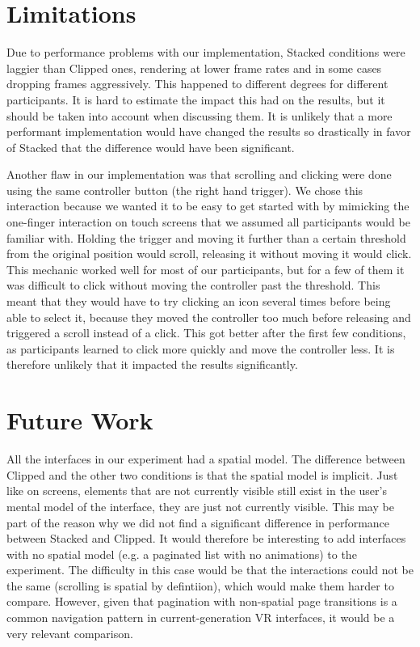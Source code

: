 \documentclass[nobib]{tufte-book} %
\begin{document}
\section{Limitations}
Due to performance problems with our implementation, Stacked conditions were laggier than Clipped ones, rendering at lower frame rates and in some cases dropping frames aggressively. This happened to different degrees for different participants. It is hard to estimate the impact this had on the results, but it should be taken into account when discussing them. It is unlikely that a more performant implementation would have changed the results so drastically in favor of Stacked that the difference would have been significant.

Another flaw in our implementation was that scrolling and clicking were done using the same controller button (the right hand trigger). We chose this interaction because we wanted it to be easy to get started with by mimicking the one-finger interaction on touch screens that we assumed all participants would be familiar with. Holding the trigger and moving it further than a certain threshold from the original position would scroll, releasing it without moving it would click. This mechanic worked well for most of our participants, but for a few of them it was difficult to click without moving the controller past the threshold. This meant that they would have to try clicking an icon several times before being able to select it, because they moved the controller too much before releasing and triggered a scroll instead of a click. This got better after the first few conditions, as participants learned to click more quickly and move the controller less. It is therefore unlikely that it impacted the results significantly.

\section{Future Work}
All the interfaces in our experiment had a spatial model. The difference between Clipped and the other two conditions is that the spatial model is implicit. Just like on screens, elements that are not currently visible still exist in the user's mental model of the interface, they are just not currently visible. This may be part of the reason why we did not find a significant difference in performance between Stacked and Clipped. It would therefore be interesting to add interfaces with no spatial model (e.g. a paginated list with no animations) to the experiment. The difficulty in this case would be that the interactions could not be the same (scrolling is spatial by defintiion), which would make them harder to compare. However, given that pagination with non-spatial page transitions is a common navigation pattern in current-generation VR interfaces, it would be a very relevant comparison.
\end{document}

